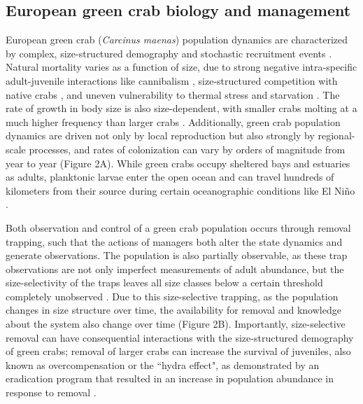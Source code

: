 \documentclass{article}
\begin{document}
\subsection{European green crab biology and management}

European green crab (\textit{Carcinus maenas}) population dynamics are characterized by complex, size-structured demography and stochastic recruitment events \parencite{keller2026integrated}. Natural mortality varies as a function of size, due to strong negative intra-specific adult-juvenile interactions like cannibalism \parencite{grosholz2021stage, romano2017cannibalism}, size-structured competition with native crabs \parencite{mcdonald2001competitive, jensen2007biotic}, and uneven vulnerability to thermal stress and starvation \parencite{hurst2007causes, henderson1988size}. The rate of growth in body size is also size-dependent, with smaller crabs molting at a much higher frequency than larger crabs \parencite{yamada2005growth}. Additionally, green crab population dynamics are driven not only by local reproduction but also strongly by regional-scale processes, and rates of colonization can vary by orders of magnitude from year to year \parencite{yamada2021ocean} (Figure 2A). While green crabs occupy sheltered bays and estuaries as adults, planktonic larvae enter the open ocean and can travel hundreds of kilometers from their source during certain oceanographic conditions like El Niño \parencite{du2024dispersal, engel2025larval}. 

Both observation and control of a green crab population occurs through removal trapping, such that the actions of managers both alter the state dynamics and generate observations. The population is also partially observable, as these trap observations are not only imperfect measurements of adult abundance, but the size-selectivity of the traps leaves all size classes below a certain threshold completely unobserved \parencite{keller2026integrated}. Due to this size-selective trapping, as the population changes in size structure over time, the availability for removal and knowledge about the system also change over time (Figure 2B). Importantly, size-selective removal can have consequential interactions with the size-structured demography of green crabs; removal of larger crabs can increase the survival of juveniles, also known as overcompensation or the ``hydra effect", as demonstrated by an eradication program that resulted in an increase in population abundance in response to removal \parencite{grosholz2021stage}.
\end{document}
